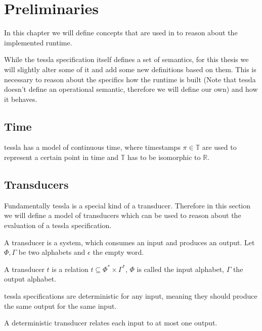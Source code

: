 \chapter{Preliminaries}
\label{sec:definitions}

In this chapter we will define concepts that are used in  to reason about the implemented runtime.

While the \gls{tessla} specification itself defines a set of semantics, for this thesis we will slightly alter some of it and add some new definitions based on them.
This is necessary to reason about the specifics how the runtime is built (Note that \gls{tessla} doesn't define an operational semantic, therefore we will define our own) and how it behaves.

\section{Time}
\label{sec:definitions:time}

\gls{tessla} has a model of continuous time, where timestamps \(\pi \in \mathbb{T} \) are used to represent a certain point in time and \(\mathbb{T}\) has to be isomorphic to \(\mathbb{R}\).

\section{Transducers}
\label{sec:definitions:transducers}

Fundamentally \gls{tessla} is a special kind of a transducer.
Therefore in this section we will define a model of transducers which can be used to reason about the evaluation of a \gls{tessla} specification.

A transducer is a system, which consumes an input and produces an output.
Let \(\Phi, \Gamma\) be two alphabets and \(\epsilon\) the empty word.

\begin{definition}[name = Transducer]\label{def:transducer}
  A transducer \(t\) is a relation \(t \subseteq \Phi^* \times \Gamma^*\), \(\Phi\) is called the input alphabet, \(\Gamma\) the output alphabet.
\end{definition}

\gls{tessla} specifications are deterministic for any input, meaning they should produce the same output for the same input.

\begin{definition}[name = Deterministic Transducer]\label{def:deterministic_transducer}
  A deterministic transducer relates each input to at most one output.
\end{definition}

